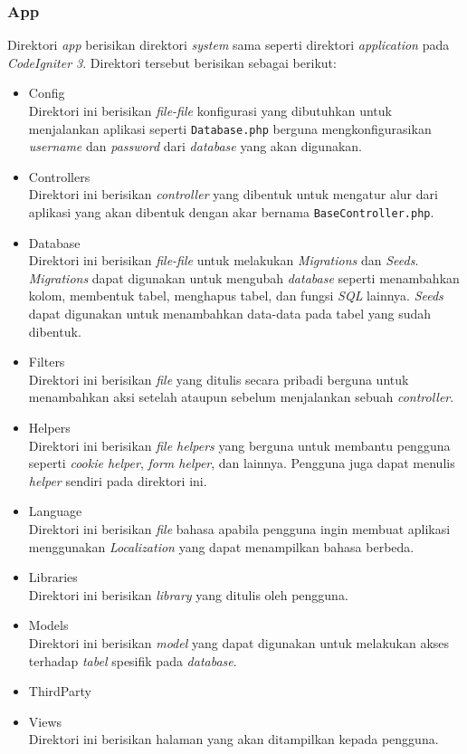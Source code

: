 \subsubsection{App}
Direktori \textit{app} berisikan direktori \textit{system} sama seperti direktori \textit{application} pada \textit{CodeIgniter 3}. Direktori tersebut berisikan sebagai berikut:
\begin{itemize}
\item Config \\ Direktori ini berisikan \textit{file-file} konfigurasi yang dibutuhkan untuk menjalankan aplikasi seperti \texttt{Database.php} berguna mengkonfigurasikan \textit{username} dan \textit{password} dari \textit{database} yang akan digunakan.
\item Controllers \\ Direktori ini berisikan \textit{controller} yang dibentuk untuk mengatur alur dari aplikasi yang akan dibentuk dengan akar bernama \verb|BaseController.php|.
\item Database \\ Direktori ini berisikan \textit{file-file} untuk melakukan \textit{Migrations} dan \textit{Seeds}. \textit{Migrations} dapat digunakan untuk mengubah \textit{database} seperti menambahkan kolom, membentuk tabel, menghapus tabel, dan fungsi \textit{SQL} lainnya. \textit{Seeds} dapat digunakan untuk menambahkan data-data pada tabel yang sudah dibentuk.
\item Filters \\Direktori ini berisikan \textit{file} yang ditulis secara pribadi berguna untuk menambahkan aksi setelah ataupun sebelum menjalankan sebuah \textit{controller}.
\item Helpers \\Direktori ini berisikan \textit{file helpers} yang berguna untuk membantu pengguna seperti \textit{cookie helper}, \textit{form helper}, dan lainnya. Pengguna juga dapat menulis \textit{helper} sendiri pada direktori ini.  
\item Language \\Direktori ini berisikan \textit{file} bahasa apabila pengguna ingin membuat aplikasi menggunakan \textit{Localization} yang dapat menampilkan bahasa berbeda.
\item Libraries \\Direktori ini berisikan \textit{library} yang ditulis oleh pengguna.
\item Models \\ Direktori ini berisikan \textit{model} yang dapat digunakan untuk melakukan akses terhadap \textit{tabel} spesifik pada \textit{database}.
\item ThirdParty
\item Views \\ Direktori ini berisikan halaman yang akan ditampilkan kepada pengguna.
\end{itemize}
